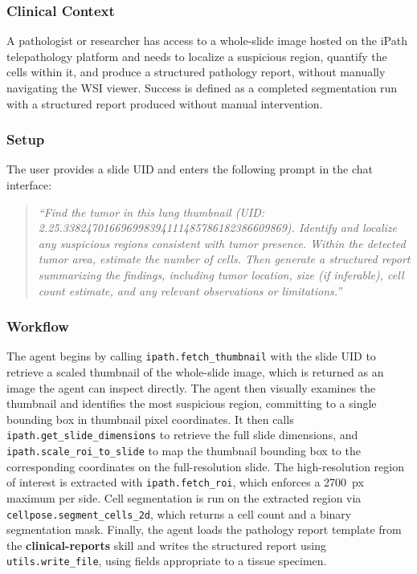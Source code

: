 \documentclass[conference]{IEEEtran}
\begin{document}
\subsubsection{Clinical Context}
A pathologist or researcher has access to a whole-slide image hosted on the iPath telepathology platform and needs to localize a suspicious region, quantify the cells within it, and produce a structured pathology report, without manually navigating the WSI viewer. Success is defined as a completed segmentation run with a structured report produced without manual intervention.

\subsubsection{Setup}
The user provides a slide UID and enters the following prompt in the chat interface:

\begin{quote}
\textit{``Find the tumor in this lung thumbnail (UID: 2.25.338247016696998394111485786182386609869). Identify and localize any suspicious regions consistent with tumor presence. Within the detected tumor area, estimate the number of cells. Then generate a structured report summarizing the findings, including tumor location, size (if inferable), cell count estimate, and any relevant observations or limitations.''}
\end{quote}

\subsubsection{Workflow}
The agent begins by calling \texttt{ipath.fetch\_thumbnail} with the slide UID to retrieve a scaled thumbnail of the whole-slide image, which is returned as an image the agent can inspect directly. The agent then visually examines the thumbnail and identifies the most suspicious region, committing to a single bounding box in thumbnail pixel coordinates. It then calls \texttt{ipath.get\_slide\_dimensions} to retrieve the full slide dimensions, and \texttt{ipath.scale\_roi\_to\_slide} to map the thumbnail bounding box to the corresponding coordinates on the full-resolution slide. The high-resolution region of interest is extracted with \texttt{ipath.fetch\_roi}, which enforces a 2700~px maximum per side. Cell segmentation is run on the extracted region via \texttt{cellpose.segment\_cells\_2d}, which returns a cell count and a binary segmentation mask. Finally, the agent loads the pathology report template from the \textbf{clinical-reports} skill and writes the structured report using \texttt{utils.write\_file}, using fields appropriate to a tissue specimen.
\end{document}
